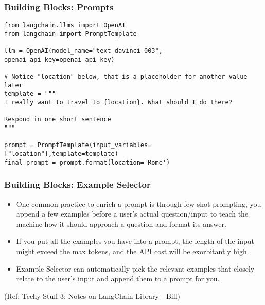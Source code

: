 \begin{frame}[fragile]\frametitle{Building Blocks: Prompts}

\begin{lstlisting}
from langchain.llms import OpenAI
from langchain import PromptTemplate

llm = OpenAI(model_name="text-davinci-003", openai_api_key=openai_api_key)

# Notice "location" below, that is a placeholder for another value later
template = """
I really want to travel to {location}. What should I do there?

Respond in one short sentence
"""

prompt = PromptTemplate(input_variables=["location"],template=template)
final_prompt = prompt.format(location='Rome')
\end{lstlisting}	  
\end{frame}

\begin{frame}[fragile]\frametitle{Building Blocks: Example Selector}

\begin{itemize}
\item One common practice to enrich a prompt is through few-shot prompting, you append a few examples before a user’s actual question/input to teach the machine how it should approach a question and format its answer.
\item If you put all the examples you have into a prompt, the length of the input might exceed the max tokens, and the API cost will be exorbitantly high.
\item Example Selector can automatically pick the relevant examples that closely relate to the user’s input and append them to a prompt for you.
\end{itemize}

{\tiny (Ref: Techy Stuff 3: Notes on LangChain Library - Bill)}

\end{frame}

